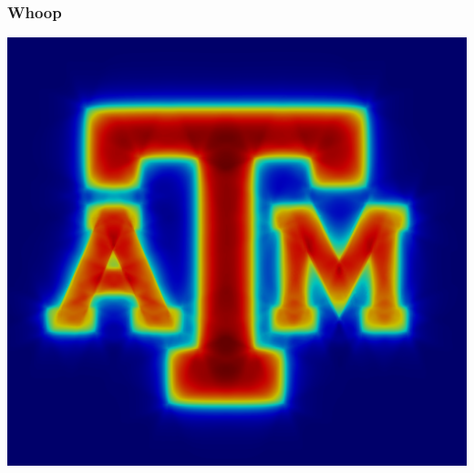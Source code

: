 \documentclass[xcolor={usenames,dvipsnames,svgnames,table}, 10pt]{beamer}
\begin{document}

\begin{frame}\frametitle{Whoop}
	\vfill
	\centering
	\includegraphics[width=0.6\linewidth]{images/atm}
	\vfill
\end{frame}
\end{document}
